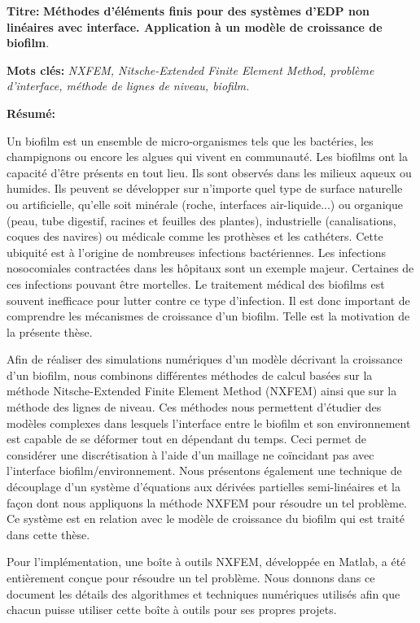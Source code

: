 \documentclass[12pt,a4paper]{article}
\begin{document}
\thispagestyle{empty}	

\begin{tcolorbox}[standard jigsaw, colframe=black!60, opacityback=0]

\smallskip

\textbf{\color{tblue}Titre:} {\color{black!90}\textbf{Méthodes d'éléments finis pour des systèmes d'EDP non linéaires avec interface. Application à un modèle de croissance de biofilm}.}

\medskip

\textbf{\color{tblue}Mots clés:} \textit{NXFEM, Nitsche-Extended Finite Element Method, problème d’interface, méthode de lignes de niveau, biofilm.}

\medskip

\textbf{\color{tblue}Résumé:} {\small Un biofilm est un ensemble  de micro-organismes tels que les  bactéries, les champignons ou encore les  algues qui  vivent en  communauté.  Les biofilms ont la capacité  d'être présents en tout lieu. Ils sont  observés dans les milieux aqueux ou humides. Ils peuvent se développer sur n'importe quel type de surface naturelle ou artificielle, qu'elle soit minérale (roche, interfaces air-liquide...) ou organique (peau, tube digestif, racines et feuilles des plantes), industrielle (canalisations, coques des navires) ou médicale  comme les prothèses et  les cathéters. Cette ubiquité est à l'origine de  nombreuses infections bactériennes. Les infections nosocomiales  contractées dans les hôpitaux sont un exemple majeur.  Certaines de ces infections pouvant être mortelles.  Le traitement médical  des biofilms  est souvent inefficace pour lutter contre ce type d'infection. Il est donc important de comprendre les mécanismes de croissance d'un biofilm. Telle est la motivation de la présente thèse.\smallskip

Afin de réaliser des simulations numériques  d'un modèle décrivant la croissance d'un biofilm, nous combinons différentes  méthodes de calcul basées sur la méthode Nitsche-Extended Finite Element Method (NXFEM) ainsi que sur la  méthode des lignes de niveau. Ces méthodes nous permettent d'étudier  des modèles  complexes  dans lesquels
l'interface entre le biofilm et son environnement est capable de se déformer tout en dépendant du temps. Ceci permet de considérer une discrétisation à l'aide d'un maillage ne coïncidant pas avec l'interface biofilm/environnement. Nous présentons également une technique de découplage d'un système d'équations aux dérivées partielles semi-linéaires et la façon dont nous appliquons la méthode NXFEM pour résoudre un tel problème. Ce système est en relation avec le modèle de croissance du biofilm qui est traité dans cette thèse.\smallskip

Pour l'implémentation, une boîte à outils NXFEM, développée en Matlab, a été entièrement conçue pour résoudre un tel problème. Nous donnons dans ce document les détails des algorithmes et techniques numériques utilisés afin que chacun puisse utiliser cette boîte à outils pour ses propres projets.}

\smallskip

\end{tcolorbox}
\end{document}
